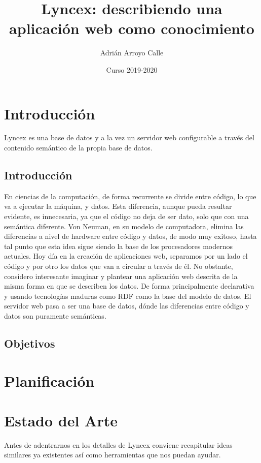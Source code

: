 \documentclass[12pt]{report} %
\title{Lyncex: describiendo una aplicación web como conocimiento}
\author{Adrián Arroyo Calle}
\date{Curso 2019-2020}
\begin{document}
\maketitle

\chapter{Introducción}

Lyncex es una base de datos y a la vez un servidor web configurable a través del contenido semántico de la propia base de datos.

\section{Introducción}
En ciencias de la computación, de forma recurrente se divide entre código, lo que va a ejecutar la máquina, y datos.
Esta diferencia, aunque pueda resultar evidente, es innecesaria, ya que el código no deja de ser dato, solo que con una semántica diferente.
Von Neuman, en su modelo de computadora, elimina las diferencias a nivel de hardware entre código y datos, de modo muy exitoso, hasta tal punto que esta idea sigue siendo la base de los procesadores modernos actuales.
Hoy día en la creación de aplicaciones web, separamos por un lado el código y por otro los datos que van a circular a través de él. 
No obstante, considero interesante imaginar y plantear una aplicación web descrita de la misma forma en que se describen los datos.
De forma principalmente declarativa y usando tecnologías maduras como RDF como la base del modelo de datos.
El servidor web pasa a ser una base de datos, dónde las diferencias entre código y datos son puramente semánticas.

\section{Objetivos}

\chapter{Planificación}

\chapter{Estado del Arte}

Antes de adentrarnos en los detalles de Lyncex conviene recapitular ideas similares ya existentes así como herramientas que nos puedan ayudar. 
\end{document}
